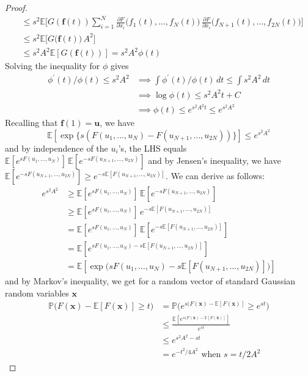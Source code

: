 \documentclass{article}
\theoremstyle{definition}
\theoremstyle{remark}
\theoremstyle{definition}
\begin{document}
\begin{proof}
\begin{align*}
      & \leq s^2 \mathbb{E} \bigg[ G(\mathbf{f}(t)) \sum_{i=1}^N \frac{\partial F}{\partial x_i} \big( f_1 (t), \ldots, f_N (t) \big) \, \frac{\partial F}{\partial x_i} \big( f_{N+1} (t), \ldots, f_{2N} (t) \big) \bigg] \\ 
      & \leq s^2 \mathbb{E} \big[ G(\mathbf{f}(t) \big) \, A^2 \big] \\
      & \leq s^2 A^2 \mathbb{E}[G(\mathbf{f}(t))] = s^2 A^2 \phi(t)
  \end{align*}
  Solving the inequality for $\phi$ gives 
  \begin{align*}
      \phi^\prime (t) / \phi(t) \leq s^2 A^2 & \implies \int \phi^\prime (t) / \phi(t) \,dt \leq \int s^2 A^2 \,dt \\
      & \implies \log{\phi(t)} \leq s^2 A^2 t + C \\
      & \implies \phi(t) \leq e^{s^2 A^2 t} \leq e^{s^2 A^2}
  \end{align*}
  Recalling that $\mathbf{f}(1) = \mathbf{u}$, we have 
  \[\mathbb{E}[\exp\{ s ( F(u_1, \ldots, u_N) - F(u_{N+1}, \ldots, u_{2N})) \}] \leq e^{s^2 A^2}\]
  and by independence of the $u_i$'s, the LHS equals $\mathbb{E}[e^{s F(u_1, \ldots, u_N)}]\, \mathbb{E}[e^{-s F(u_{N+1}, \ldots, u_{2N})}]$ and by Jensen's inequality, we have $\mathbb{E}[e^{-s F(u_{N+1}, \ldots, u_{2N})}] \geq e^{-s \mathbb{E}[F(u_{N+1}, \ldots, u_{2N})]}$. We can derive as follows: 
  \begin{align*}
      e^{s^2 A^2} & \geq \mathbb{E}[e^{s F(u_1, \ldots, u_N)}]\, \mathbb{E}[e^{-s F(u_{N+1}, \ldots, u_{2N})}] \\
      & \geq \mathbb{E}[e^{s F(u_1, \ldots, u_N)}]\, e^{-s \mathbb{E}[F(u_{N+1}, \ldots, u_{2N})]} \\
      & = \mathbb{E}[e^{s F(u_1, \ldots, u_N)}]\, \mathbb{E}[e^{-s \mathbb{E}[F(u_{N+1}, \ldots, u_{2N})]}] \\
      & = \mathbb{E}[e^{s F(u_1, \ldots, u_N) -s \mathbb{E}[F(u_{N+1}, \ldots, u_{2N})]}] \\
      & = \mathbb{E}[\exp \big( s F(u_1, \ldots, u_N) -s \mathbb{E}[F(u_{N+1}, \ldots, u_{2N})] \big) ]
  \end{align*}
  and by Markov's inequality, we get for a random vector of standard Gaussian random variables $\mathbf{x}$
  \begin{align*}
      \mathbb{P} \big( F(\mathbf{x}) - \mathbb{E}[F(\mathbf{x})] \geq t) & = \mathbb{P} \big( e^{s( F(\mathbf{x}) - \mathbb{E}[F(\mathbf{x})]} \geq e^{st} \big) \\
      & \leq \frac{\mathbb{E}[e^{s( F(\mathbf{x}) - \mathbb{E}[F(\mathbf{x})]}]}{e^{st}} \\
      & \leq e^{s^2 A^2 - st} \\
      & = e^{- t^2 / 4A^2} \text{ when } s = t / 2A^2
  \end{align*}
  \end{proof}
\end{document}
